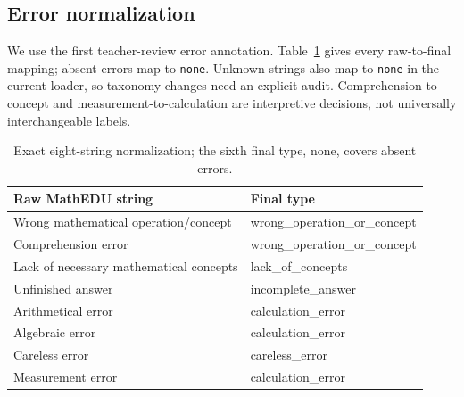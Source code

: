 \documentclass[11pt]{article}
\newcommand{\code}[1]{\texttt{\small #1}}
\begin{document}
\subsection{Error normalization}
We use the first teacher-review error annotation. Table~\ref{tab:mapping} gives every raw-to-final mapping; absent errors map to \code{none}. Unknown strings also map to \code{none} in the current loader, so taxonomy changes need an explicit audit. Comprehension-to-concept and measurement-to-calculation are interpretive decisions, not universally interchangeable labels.
\begin{table}[htbp]\centering\small
\caption{Exact eight-string normalization; the sixth final type, none, covers absent errors.}\label{tab:mapping}
\begin{tabular}{@{}p{.49\linewidth}p{.45\linewidth}@{}}\toprule
Raw MathEDU string & Final type\\\midrule
Wrong mathematical operation/concept & wrong\_operation\_or\_concept\\
Comprehension error & wrong\_operation\_or\_concept\\
Lack of necessary mathematical concepts & lack\_of\_concepts\\
Unfinished answer & incomplete\_answer\\
Arithmetical error & calculation\_error\\
Algebraic error & calculation\_error\\
Careless error & careless\_error\\
Measurement error & calculation\_error\\\bottomrule
\end{tabular}\end{table}
\end{document}
